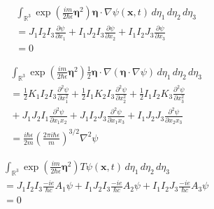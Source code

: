 \documentclass[12pt]{article}
\newcommand\INT{\int_{\mathbb R^3}}
\begin{document}
\begin{align*}
&
\INT\exp\left(\frac{im}{2\hbar\epsilon}\boldsymbol\eta^2\right)
\boldsymbol\eta\cdot\nabla\psi(\mathbf x,t)
\,d\eta_1\,d\eta_2\,d\eta_3
\\
&{}
=J_1 I_2 I_3 \frac{\partial\psi}{\partial x_1}
+I_1 J_2 I_3 \frac{\partial\psi}{\partial x_2}
+I_1 I_2 J_3 \frac{\partial\psi}{\partial x_3}
\\
&{}
=0
\tag{8}
\end{align*}

\begin{align*}
&\INT\exp\left(\frac{im}{2\hbar\epsilon}\boldsymbol\eta^2\right)
\tfrac{1}{2}\boldsymbol\eta\cdot\nabla(\boldsymbol\eta\cdot\nabla\psi)
\,d\eta_1\,d\eta_2\,d\eta_3
\\
&{}
=\tfrac{1}{2}K_1 I_2 I_3 \frac{\partial^2\psi}{\partial x_1^2}
+\tfrac{1}{2}I_1 K_2 I_3 \frac{\partial^2\psi}{\partial x_2^2}
+\tfrac{1}{2}I_1 I_2 K_3 \frac{\partial^2\psi}{\partial x_3^2}
\\
&{}
+J_1 J_2 I_1 \frac{\partial^2\psi}{\partial x_1 x_2}
+J_1 I_2 J_3 \frac{\partial^2\psi}{\partial x_1 x_3}
+I_1 J_2 J_3 \frac{\partial^2\psi}{\partial x_2 x_3}
\\
&{}=\frac{i\hbar\epsilon}{2m}\left(\frac{2\pi i\hbar\epsilon}{m}\right)^{3/2}\nabla^2\psi
\tag{9}
\end{align*}

\begin{align*}
&
\INT
\exp\left(\frac{im}{2\hbar\epsilon}\boldsymbol\eta^2\right)
T %
\psi(\mathbf x,t)
\,d\eta_1\,d\eta_2\,d\eta_3
\\
&{}
=J_1 I_2 I_3\frac{-ie}{\hbar c}A_1 \psi
+I_1 J_2 I_3\frac{-ie}{\hbar c}A_2 \psi
+I_1 I_2 J_3\frac{-ie}{\hbar c}A_3 \psi
\\
&{}
=0
\tag{10}
\end{align*}
\end{document}
